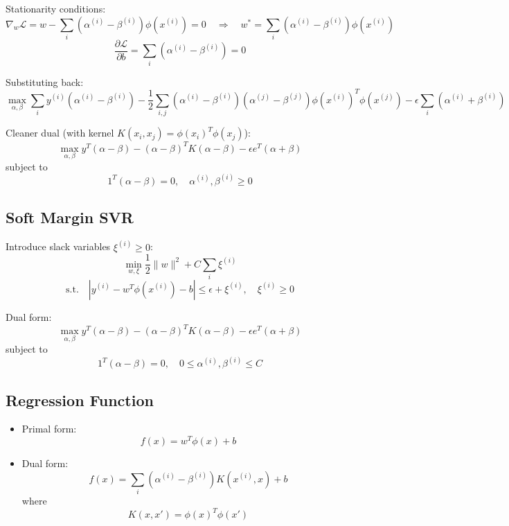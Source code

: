 \documentclass[11pt]{article}
\begin{document}
Stationarity conditions:
\[
	\nabla_w \mathcal{L} = w - \sum_i (\alpha^{(i)} - \beta^{(i)})\phi(x^{(i)}) = 0
	\quad \Rightarrow \quad
	w^* = \sum_i (\alpha^{(i)} - \beta^{(i)}) \phi(x^{(i)})
\]
\[
	\frac{\partial \mathcal{L}}{\partial b} = \sum_i (\alpha^{(i)} - \beta^{(i)}) = 0
\]

Substituting back:
\[
	\max_{\alpha, \beta} \sum_i y^{(i)}(\alpha^{(i)} - \beta^{(i)})
	- \frac{1}{2} \sum_{i,j} (\alpha^{(i)} - \beta^{(i)})(\alpha^{(j)} - \beta^{(j)})
	\phi(x^{(i)})^T \phi(x^{(j)})
	- \epsilon \sum_i (\alpha^{(i)} + \beta^{(i)})
\]

Cleaner dual (with kernel $K(x_i, x_j) = \phi(x_i)^T \phi(x_j)$):
\[
	\max_{\alpha, \beta}
	y^T (\alpha - \beta)
	- (\alpha - \beta)^T K (\alpha - \beta)
	- \epsilon e^T (\alpha + \beta)
\]
subject to
\[
	1^T (\alpha - \beta) = 0, \quad \alpha^{(i)}, \beta^{(i)} \geq 0
\]


\subsection*{Soft Margin SVR}
Introduce slack variables $\xi^{(i)} \geq 0$:
\[
	\min_{w, \xi} \frac{1}{2}\|w\|^2 + C \sum_i \xi^{(i)}
\]
\[
	\text{s.t.} \quad |y^{(i)} - w^T\phi(x^{(i)}) - b| \leq \epsilon + \xi^{(i)},
	\quad \xi^{(i)} \geq 0
\]

Dual form:
\[
	\max_{\alpha, \beta}
	y^T (\alpha - \beta)
	- (\alpha - \beta)^T K (\alpha - \beta)
	- \epsilon e^T (\alpha + \beta)
\]
subject to
\[
	1^T (\alpha - \beta) = 0, \quad 0 \leq \alpha^{(i)}, \beta^{(i)} \leq C
\]

\subsection*{Regression Function}
\begin{itemize}
	\item Primal form:
	      \[
		      f(x) = w^T \phi(x) + b
	      \]
	\item Dual form:
	      \[
		      f(x) = \sum_i (\alpha^{(i)} - \beta^{(i)}) K(x^{(i)}, x) + b
	      \]
	      where
	      \[
		      K(x, x') = \phi(x)^T \phi(x')
	      \]
\end{itemize}
\end{document}
